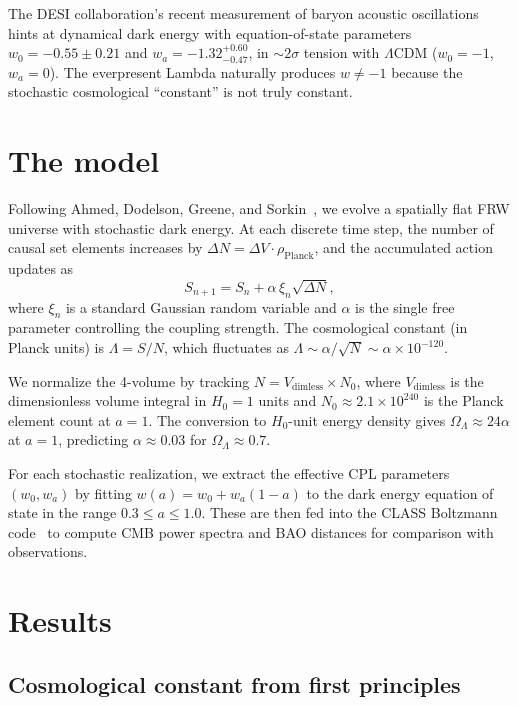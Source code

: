 \documentclass[aps,prd,twocolumn,superscriptaddress,nofootinbib]{revtex4-2}
\begin{document}
The DESI collaboration's recent measurement of baryon acoustic oscillations~\cite{desi2024} hints at dynamical dark energy with equation-of-state parameters $w_0 = -0.55 \pm 0.21$ and $w_a = -1.32^{+0.60}_{-0.47}$, in $\sim$$2\sigma$ tension with $\Lambda$CDM ($w_0 = -1$, $w_a = 0$). The everpresent Lambda naturally produces $w \neq -1$ because the stochastic cosmological ``constant'' is not truly constant.

\section{The model}

Following Ahmed, Dodelson, Greene, and Sorkin~\cite{ahmed2004}, we evolve a spatially flat FRW universe with stochastic dark energy. At each discrete time step, the number of causal set elements increases by $\Delta N = \Delta V \cdot \rho_{\mathrm{Planck}}$, and the accumulated action updates as
\begin{equation}
S_{n+1} = S_n + \alpha\, \xi_n \sqrt{\Delta N},
\end{equation}
where $\xi_n$ is a standard Gaussian random variable and $\alpha$ is the single free parameter controlling the coupling strength. The cosmological constant (in Planck units) is $\Lambda = S/N$, which fluctuates as $\Lambda \sim \alpha / \sqrt{N} \sim \alpha \times 10^{-120}$.

We normalize the 4-volume by tracking $N = V_{\mathrm{dimless}} \times N_0$, where $V_{\mathrm{dimless}}$ is the dimensionless volume integral in $H_0 = 1$ units and $N_0 \approx 2.1 \times 10^{240}$ is the Planck element count at $a = 1$. The conversion to $H_0$-unit energy density gives $\Omega_\Lambda \approx 24\alpha$ at $a = 1$, predicting $\alpha \approx 0.03$ for $\Omega_\Lambda \approx 0.7$.

For each stochastic realization, we extract the effective CPL parameters $(w_0, w_a)$ by fitting $w(a) = w_0 + w_a(1-a)$ to the dark energy equation of state in the range $0.3 \leq a \leq 1.0$. These are then fed into the CLASS Boltzmann code~\cite{class} to compute CMB power spectra and BAO distances for comparison with observations.

\section{Results}

\subsection{Cosmological constant from first principles}
\end{document}
